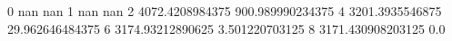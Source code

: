0 nan nan
1 nan nan
2 4072.4208984375 900.989990234375
4 3201.3935546875 29.962646484375
6 3174.93212890625 3.501220703125
8 3171.430908203125 0.0
